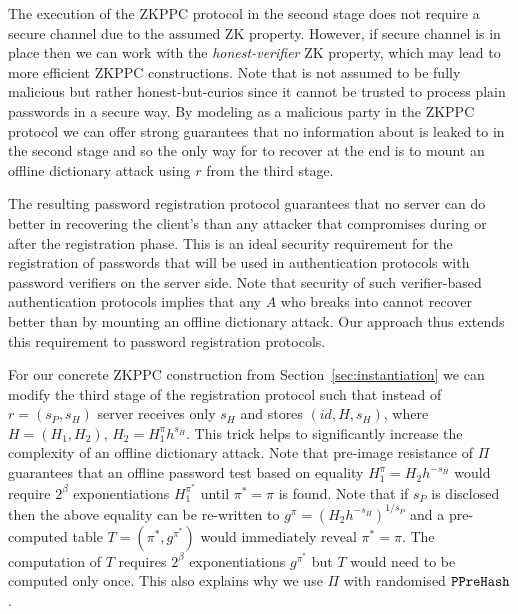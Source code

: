 The execution of the \ac{ZKPPC} protocol in the second stage does not require a secure channel due to the assumed \ac{ZK} property. 
However, if secure channel is in place then we can work with the \emph{honest-verifier} \ac{ZK} property, which may lead to more efficient \ac{ZKPPC} constructions. 
Note that \Server is not assumed to be fully malicious but rather honest-but-curios since it cannot be trusted to process plain passwords in a secure way. 
By modeling \Server as a malicious party in the \ac{ZKPPC} protocol we can offer strong guarantees that no information about \pwd is leaked to \Server in the second stage and so the only way for \Server to recover \pwd at the end is to mount an offline dictionary attack using $r$ from the third stage.

The resulting password registration protocol guarantees that no server \Server can do better in recovering the client's \pwd than any attacker \cA that compromises \Server during or after the registration phase. 
This is an ideal security requirement for the registration of passwords that will be used in authentication protocols with password verifiers on the server side. 
Note that security of such verifier-based authentication protocols implies that any $A$ who breaks into \Server cannot recover \pwd better than by mounting an offline dictionary attack. 
Our approach thus extends this requirement to password registration protocols.

For our concrete \ac{ZKPPC} construction from Section~\ref{sec:instantiation} we can modify the third stage of the registration protocol such that instead of $r=(s_P,s_H)$ server \Server receives only $s_H$ and stores $(id, H, s_H)$, where $H=(H_1, H_2)$, $H_2=H_1^\pi h^{s_H}$. This trick helps to significantly increase the complexity of an offline dictionary attack. Note that pre-image resistance of $\Pi$ guarantees that an offline password test based on equality $H_1^{\pi} = H_2h^{-s_H}$ would require $2^\beta$ exponentiations $H_1^{\pi^\ast}$ until $\pi^\ast=\pi$ is found. Note that if $s_P$ is disclosed then the above equality can be re-written to $g^{\pi} = (H_2h^{-s_H})^{1/s_P}$ and a pre-computed table $T=(\pi^\ast, g^{\pi^\ast})$ would immediately reveal $\pi^\ast=\pi$. The computation of $T$ requires $2^\beta$ exponentiations $g^{\pi^\ast}$ but $T$ would need to be computed only once. This also explains why we use $\Pi$ with randomised $\mathtt{PPreHash}$.

